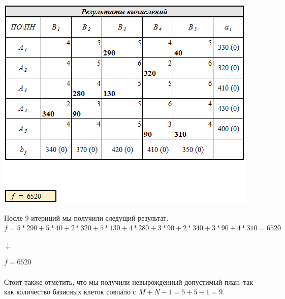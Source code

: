 \documentclass[14pt,a4paper,fleqn]{extarticle}
\begin{document}
\begin{center}
	\includegraphics[scale=0.6]{13}
\end{center}
После 9 итериций мы получили следущий результат.\\
\small $f = 5*290 + 5*40 + 2*320 + 5*130 + 4*280 + 3*90 + 2*340 + 3*90 + 4*310 = 6520$
\begin{center}
$\downarrow$
\end{center}
$f = 6520$\\\\
Стоит также отметить, что мы получили невырожденный допустимый план, так как количество базисных клеток совпало с $M+N-1 = 5+5-1 = 9$.
\newpage
\end{document}
